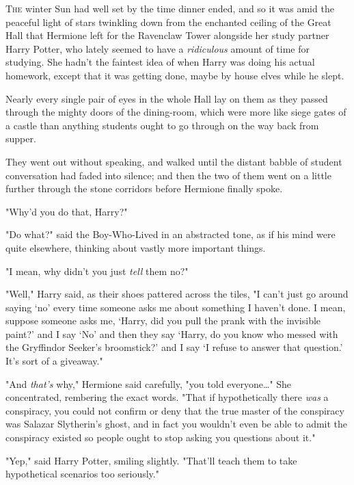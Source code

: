 
\lettrine{T}{he} winter Sun 
had well set by the time dinner ended, and so it was amid the peaceful light of 
stars twinkling down from the enchanted ceiling of the Great Hall that Hermione 
left for the Ravenclaw Tower alongside her study partner Harry Potter, who 
lately seemed to have a \emph{ridiculous} amount of time for studying. She 
hadn't the faintest idea of when Harry was doing his actual homework, except 
that it was getting done, maybe by house elves while he slept.

Nearly every single pair of eyes in the whole Hall lay on them as they passed 
through the mighty doors of the dining-room, which were more like siege gates 
of a castle than anything students ought to go through on the way back from 
supper.

They went out without speaking, and walked until the distant babble of student 
conversation had faded into silence; and then the two of them went on a little 
further through the stone corridors before Hermione finally spoke.

"Why'd you do that, Harry?"

"Do what?" said the Boy-Who-Lived in an abstracted tone, as if his mind were 
quite elsewhere, thinking about vastly more important things.

"I mean, why didn't you just \emph{tell} them no?"

"Well," Harry said, as their shoes pattered across the tiles, "I can't just go 
around saying `no' every time someone asks me about something I haven't done. I 
mean, suppose someone asks me, `Harry, did you pull the prank with the 
invisible paint?' and I say `No' and then they say `Harry, do you know who 
messed with the Gryffindor Seeker's broomstick?' and I say `I refuse to answer 
that question.' It's sort of a giveaway."

"And \emph{that's} why," Hermione said carefully, "you told everyone{\ldots}" 
She concentrated, rembering the exact words. "That if hypothetically there 
\emph{was} a conspiracy, you could not confirm or deny that the true master of 
the conspiracy was Salazar Slytherin's ghost, and in fact you wouldn't even be 
able to admit the conspiracy existed so people ought to stop asking you 
questions about it."

"Yep," said Harry Potter, smiling slightly. "That'll teach them to take 
hypothetical scenarios too seriously."

